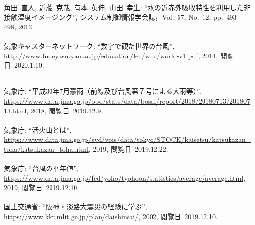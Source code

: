 \begin{mythebibliography}{}
\leavevmode \\角田~直人, 近藤~克哉, 有本~英伸, 山田~幸生:
\newblock ``水の近赤外吸収特性を利用した非接触温度イメージング'',
\newblock システム制御情報学会誌，Vol.~57, No.~12, pp.~493--498, 2013.
\\

\leavevmode \\気象キャスターネットワーク:
\newblock ``数字で観た世界の台風'', 
\newblock \url{http://www.fudeyasu.ynu.ac.jp/education/lec/wnc/world-v1.pdf}, 2014, 
\newblock \mbox{閲覧日 2020.1.10}.
\\

\newpage

\leavevmode \\気象庁:
\newblock ``平成30年7月豪雨（前線及び台風第７号による大雨等）'', 
\newblock \hspace{-1mm} \url{https://www.data.jma.go.jp/obd/stats/data/bosai/report/2018/20180713/20180713.html}, 2018, 
\newblock \mbox{閲覧日 2019.12.9}.
\\

\leavevmode \\気象庁:
\newblock ``活火山とは'', 
\newblock \url{https://www.data.jma.go.jp/svd/vois/data/tokyo/STOCK/kaisetsu/katsukazan_toha/katsukazan_toha.html}, 2019, 
\newblock \mbox{閲覧日 2019.12.22}.
\\

\leavevmode \\気象庁:
\newblock ``台風の平年値'', 
\newblock \url{https://www.data.jma.go.jp/fcd/yoho/typhoon/statistics/average/average.html}, 2019, 
\newblock \mbox{閲覧日 2019.12.10}.
\\

\leavevmode \\国土交通省:
\newblock ``阪神・淡路大震災の経験に学ぶ'', \\
\newblock \url{https://www.kkr.mlit.go.jp/plan/daishinsai/}, 2002, 
\newblock \mbox{閲覧日 2019.12.10}.
\\


\end{mythebibliography}
